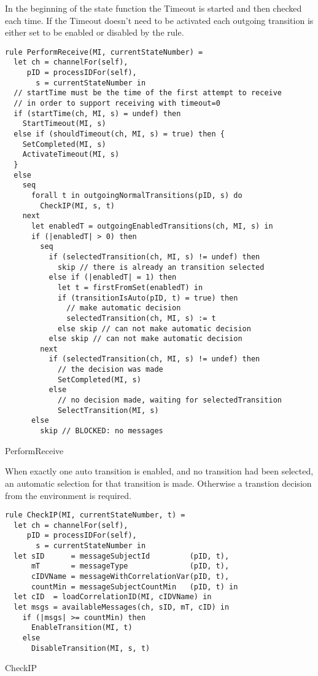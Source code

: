 In the beginning of the state function the Timeout is started and then checked
each time.
If the Timeout doesn't need to be activated each outgoing transition is either set to
be enabled or disabled by the  rule.


\begin{listing}[H]
\begin{verbatim}
rule PerformReceive(MI, currentStateNumber) =
  let ch = channelFor(self),
     pID = processIDFor(self),
       s = currentStateNumber in
  // startTime must be the time of the first attempt to receive
  // in order to support receiving with timeout=0
  if (startTime(ch, MI, s) = undef) then
    StartTimeout(MI, s)
  else if (shouldTimeout(ch, MI, s) = true) then {
    SetCompleted(MI, s)
    ActivateTimeout(MI, s)
  }
  else
    seq
      forall t in outgoingNormalTransitions(pID, s) do
        CheckIP(MI, s, t)
    next
      let enabledT = outgoingEnabledTransitions(ch, MI, s) in
      if (|enabledT| > 0) then
        seq
          if (selectedTransition(ch, MI, s) != undef) then
            skip // there is already an transition selected
          else if (|enabledT| = 1) then
            let t = firstFromSet(enabledT) in
            if (transitionIsAuto(pID, t) = true) then
              // make automatic decision
              selectedTransition(ch, MI, s) := t
            else skip // can not make automatic decision
          else skip // can not make automatic decision
        next
          if (selectedTransition(ch, MI, s) != undef) then
            // the decision was made
            SetCompleted(MI, s)
          else
            // no decision made, waiting for selectedTransition
            SelectTransition(MI, s)
      else
        skip // BLOCKED: no messages
\end{verbatim}
\caption{PerformReceive}
\label{lst:shortasm:PerformReceive}
\end{listing}




When exactly one auto transition is enabled, and no transition had been selected, an
automatic selection for that transition is made. Otherwise a transtion decision from
the environment is required.




\begin{listing}[H]
\begin{verbatim}
rule CheckIP(MI, currentStateNumber, t) =
  let ch = channelFor(self),
     pID = processIDFor(self),
       s = currentStateNumber in
  let sID      = messageSubjectId         (pID, t),
      mT       = messageType              (pID, t),
      cIDVName = messageWithCorrelationVar(pID, t),
      countMin = messageSubjectCountMin   (pID, t) in
  let cID  = loadCorrelationID(MI, cIDVName) in
  let msgs = availableMessages(ch, sID, mT, cID) in
    if (|msgs| >= countMin) then
      EnableTransition(MI, t)
    else
      DisableTransition(MI, s, t)
\end{verbatim}
\caption{CheckIP}
\label{lst:shortasm:CheckIP}
\end{listing}


